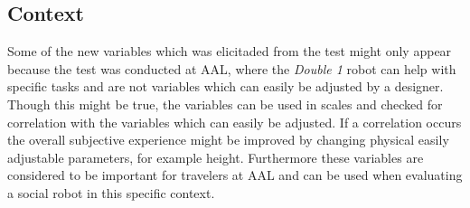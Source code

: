 \subsection{Context}
 Some of the new variables which was elicitaded from the test might only appear because the test was conducted at AAL, where the \textit{Double 1} robot can help with specific tasks and are not variables which can easily be adjusted by a designer. Though this might be true, the variables can be used in scales and checked for correlation with the variables which can easily be adjusted. If a correlation occurs the overall subjective experience might be improved by changing physical easily adjustable parameters, for example height. Furthermore these variables are considered to be important for travelers at AAL and can be used when evaluating a social robot in this specific context. 